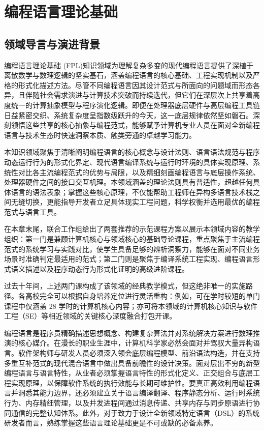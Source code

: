 \chapter{编程语言理论基础}

\section{领域导言与演进背景}

\begin{preamblebox}[知识领域概述与变革]
编程语言理论基础 (FPL)知识领域为理解复杂多变的现代编程语言提供了深植于离散数学与数理逻辑的坚实基石，涵盖编程语言的核心基础、工程实现机制以及严格的形式化描述方法。尽管不同编程语言因其设计范式与所面向的问题域而形态各异，且伴随社会需求演进与计算技术突破而持续迭代，但它们在深层次上共享着高度统一的计算抽象模型与程序演化逻辑。即便在处理器底层硬件与高层编程工具链日益紧密交织、系统复杂度呈指数级跃升的今天，这一底层规律依然坚如磐石。深刻领悟这些共享的核心抽象与编程范式，能够赋予计算机专业人员在面对全新编程语言与技术生态时快速洞察本质、触类旁通的卓越学习能力。

本知识领域聚焦于清晰阐明编程语言的核心概念与设计法则、语言语法规范与程序动态运行行为的形式化界定、现代语言编译系统与运行时环境的具体实现原理、系统性对比各主流编程范式的优势与局限，以及精细刻画编程语言与底层操作系统、处理器硬件之间的接口交互机理。本领域涵盖的理论法则具有普适性，超越任何具体语言的语法表象；掌握这些核心原理，不仅能帮助工程师在异构多语言技术栈之间无缝切换，更能指导开发者立足具体现实工程问题，科学权衡并选用最优的编程范式与语言工具。

在本章末尾，联合工作组给出了两套推荐的示范课程方案以展示本领域内容的教学组织：第一门是兼顾计算机核心与领域核心的基础导论课程，重点聚焦于主流编程范式的系统学习与实践对比，使学生具备足够的辨析洞察力，能够在面对不同业务场景时准确判定最适用的范式；第二门则是聚焦于编译系统工程实现、编程语言形式语义描述以及程序动态行为形式化证明的高级进阶课程。

过去十年间，上述两门课构成了该领域的经典教学模式，但这绝非唯一的实施路径。各高校完全可以根据自身培养定位进行灵活重构：例如，可在学时较短的单门课程中仅涵盖 28 学时的计算机核心内容；亦可将本领域的计算机核心知识与软件工程（SE）等相近领域的关键核心深度融合打包开课。

编程语言是程序员精确描述思想概念、构建复杂算法并对系统解决方案进行数理推演的核心媒介。在漫长的职业生涯中，计算机科学家必然会面对并驾驭大量异构语言。软件架构师与研发人员必须深入领会底层编程模型、前沿语法构造，并在支持多重互补范式的现代混合语言中做出具备前瞻性的设计决策。面对层出不穷的新型编程语言与语言特性，从业者必须掌握语言特性的形式化定义、正交组合与底层工程实现原理，以保障软件系统的执行效能与长期可维护性。要真正高效利用编程语言并洞悉其能力边界，还必须建立关于语言编译翻译、程序静态分析、运行时系统行为、内存精细管理，以及并发进程间通过消息传递、共享内存与同步原语进行协同通信的完整认知体系。此外，对于致力于设计全新领域特定语言（DSL）的系统研发者而言，熟练掌握这些语言理论基础更是不可或缺的必备素养。


\end{preamblebox}
